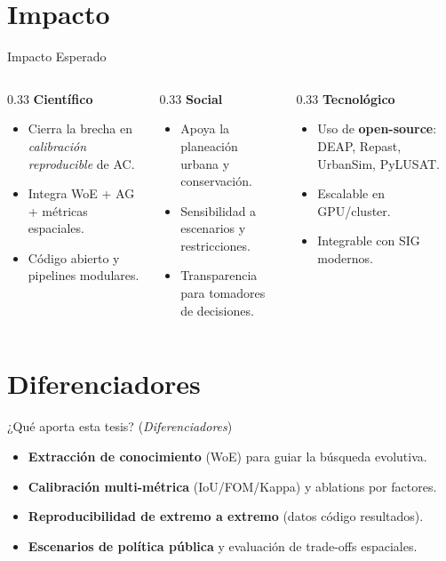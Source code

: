 \documentclass[aspectratio=169]{beamer}
\begin{document}
\section{Impacto}
\begin{frame}{Impacto Esperado}
  \begin{columns}[T]
    \begin{column}{0.33\textwidth}
      \textbf{Científico}
      \begin{itemize}
        \item Cierra la brecha en \emph{calibración reproducible} de AC.
        \item Integra WoE + AG + métricas espaciales.
        \item Código abierto y pipelines modulares.
      \end{itemize}
    \end{column}
    \begin{column}{0.33\textwidth}
      \textbf{Social}
      \begin{itemize}
        \item Apoya la planeación urbana y conservación.
        \item Sensibilidad a escenarios y restricciones.
        \item Transparencia para tomadores de decisiones.
      \end{itemize}
    \end{column}
    \begin{column}{0.33\textwidth}
      \textbf{Tecnológico}
      \begin{itemize}
        \item Uso de \textbf{open-source}: DEAP, Repast, UrbanSim, PyLUSAT.
        \item Escalable en GPU/cluster.
        \item Integrable con SIG modernos.
      \end{itemize}
    \end{column}
  \end{columns}
\end{frame}

\section{Diferenciadores}
\begin{frame}{¿Qué aporta esta tesis? (\emph{Diferenciadores})}
  \begin{itemize}
    \item \textbf{Extracción de conocimiento} (WoE) para guiar la búsqueda evolutiva.
    \item \textbf{Calibración multi-métrica} (IoU/FOM/Kappa) y ablations por factores.
    \item \textbf{Reproducibilidad de extremo a extremo} (datos \textrightarrow{} código \textrightarrow{} resultados).
    \item \textbf{Escenarios de política pública} y evaluación de trade-offs espaciales.
  \end{itemize}
\end{frame}
\end{document}
